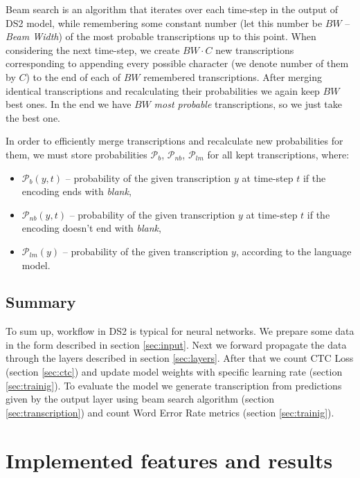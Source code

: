\documentclass[licencjacka,en]{pracamgr}
\begin{document}
	Beam search is an algorithm that iterates over each time-step in the output of DS2 model, while remembering some constant number (let this number be $BW$ -- \textit{Beam Width}) of the most probable transcriptions up to this point. When considering the next time-step, we create $BW \cdot C$ new transcriptions corresponding to appending every possible character (we denote number of them by $C$) to the end of each of $BW$ remembered transcriptions. After merging identical transcriptions and recalculating their probabilities we again keep $BW$ best ones. In the end we have $BW$ \textit{most probable} transcriptions, so we just take the best one.
	
	In order to efficiently merge transcriptions and recalculate new probabilities for them, we must store probabilities $\mathcal{P}_{b}$, $\mathcal{P}_{nb}$, $\mathcal{P}_{lm}$ for all kept transcriptions, where:
	\begin{itemize}
		\item $\mathcal{P}_{b}(y, t)$ -- probability of the given transcription $y$ at time-step $t$ if the encoding ends with \textit{blank},
		\item $\mathcal{P}_{nb}(y, t)$ -- probability of the given transcription $y$ at time-step $t$ if the encoding doesn't end with \textit{blank},
		\item $\mathcal{P}_{lm}(y)$ -- probability of the given transcription $y$, according to the language model.\\
	\end{itemize}
	
	\section{Summary}
	To sum up, workflow in DS2 is typical for neural networks. We prepare some data in the form described in section \ref{sec:input}. Next we forward propagate the data through the layers described in section \ref{sec:layers}. After that we count CTC Loss (section \ref{sec:ctc}) and update model weights with specific learning rate (section \ref{sec:trainig}). To evaluate the model we generate transcription from predictions given by the output layer using beam search algorithm (section \ref{sec:transcription}) and count Word Error Rate metrics (section \ref{sec:trainig}).
	
	
	\chapter{Implemented features and results}\label{r:results}
    
\end{document}
